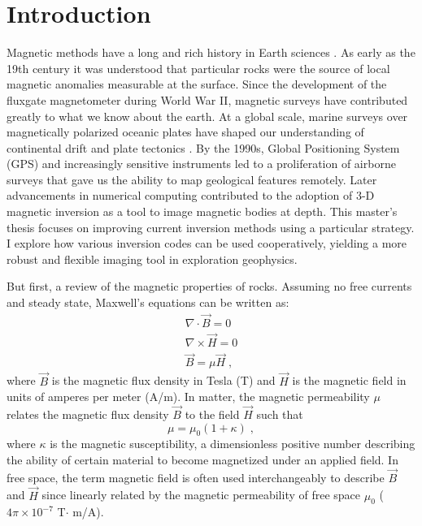 \graphicspath{{./Figures/}}
\chapter{Introduction}
\label{ch:Introduction}
Magnetic methods have a long and rich history in Earth sciences \cite[]{Nabighian05}.
As early as the 19th century it was understood that particular rocks were the source of local magnetic anomalies measurable at the surface.
Since the development of the fluxgate magnetometer during World War II, magnetic surveys have contributed greatly to what we know about the earth.
At a global scale, marine surveys over magnetically polarized oceanic plates have shaped our understanding of continental drift and plate tectonics \cite[]{Vine1963}.
By the 1990s, Global Positioning System (GPS) and increasingly sensitive instruments led to a proliferation of airborne surveys that gave us the ability to map geological features remotely.
Later advancements in numerical computing contributed to the adoption of 3-D magnetic inversion as a tool to image magnetic bodies at depth.
This master's thesis focuses on improving current inversion methods using a particular strategy.
I explore how various inversion codes can be used cooperatively, yielding a more robust and flexible imaging tool in exploration geophysics.

But first, a review of the magnetic properties of rocks.
Assuming no free currents and steady state, Maxwell's equations can be written as:
\begin{gather} \label{Maxwells}
	\nabla \cdot \vec{B} = 0 \\
	\nabla \times \vec{H} = 0 \\
	\vec{B} = \mu \vec{H} \;,
\end{gather}
where $\vec{B}$ is the magnetic flux density in Tesla (T) and $\vec{H}$ is the magnetic field in units of amperes per meter (A/m).
In matter, the magnetic permeability $\mu$ relates the magnetic flux density $\vec{B}$ to the field $\vec{H}$ such that
 \begin{equation}
	\mu = \mu_0 (1+\kappa)\;,
\end{equation}
where $\kappa$ is the  magnetic susceptibility, a dimensionless positive number describing the ability of certain material to become magnetized under an applied field. 
In free space, the term magnetic field is often used interchangeably to describe $\vec{B}$ and  $\vec{H}$ since linearly related by the magnetic permeability of free space $\mu_0$ ($4\pi\times10^{-7}$ T$\cdot$ m/A).
 

